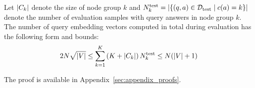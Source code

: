 \begin{proposition}
\label{proposition:complexity}
Let $\mathopen{}\left|C_k\right|$ denote the size of node group $k$ and $N_k^{\text{test}}=\mathopen{}\left|\mathopen{}\left\{\mathopen{}\left(q, a\right) \in \mathcal{D}_{\text{test}} \mid c\mathopen{}\left(a\right)=k\right\}\right|$ denote the number of evaluation samples with query answers in node group $k$. The number of query embedding vectors computed in total during evaluation has the following form and bounds:
\begin{equation}
\label{eq:complexity_and_bounds}
2 N \sqrt{\mathopen{}\left|V\right|} \leq \sum_{k=1}^{K}{\mathopen{}\left(K+\mathopen{}\left|C_k\right|\right)N_k^{\text{test}}} \leq N \mathopen{}\left(\mathopen{}\left|V\right| + 1\right) 
\end{equation}
\end{proposition}
The proof is available in Appendix~\ref{sec:appendix_proofs}.
    

